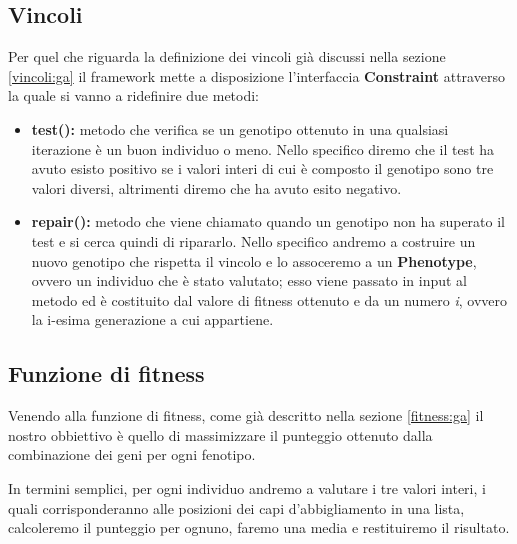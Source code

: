 \documentclass[a4paper, 11pt, oneside]{report}
\begin{document}
                \subsection{Vincoli}
                \par \noindent Per quel che riguarda la definizione dei vincoli già discussi nella sezione \ref{vincoli:ga}
                il framework mette a disposizione l'interfaccia \textbf{Constraint} attraverso la quale si vanno a ridefinire
                due metodi:
                \begin{itemize}
                    \item \textbf{test():} metodo che verifica se un genotipo ottenuto in una qualsiasi iterazione è un
                    buon individuo o meno.
                    Nello specifico diremo che il test ha avuto esisto positivo se i valori interi di cui è composto il
                    genotipo sono tre valori diversi, altrimenti diremo che ha avuto esito negativo.
                    \item \textbf{repair():} metodo che viene chiamato quando un genotipo non ha superato il test e si
                    cerca quindi di ripararlo.
                    Nello specifico andremo a costruire un nuovo genotipo che rispetta il vincolo e lo assoceremo a un
                    \textbf{Phenotype}, ovvero un individuo che è stato valutato; esso viene passato in input al metodo
                    ed è costituito dal valore di fitness ottenuto e da un numero \emph{i}, ovvero la i-esima generazione
                    a cui appartiene.
                \end{itemize}

                \subsection{Funzione di fitness}
                \par \noindent Venendo alla funzione di fitness, come già descritto nella sezione \ref{fitness:ga} il
                nostro obbiettivo è quello di massimizzare il punteggio ottenuto dalla combinazione dei geni per ogni
                fenotipo.
                \par \noindent In termini semplici, per ogni individuo andremo a valutare i tre valori interi, i quali
                corrisponderanno alle posizioni dei capi d'abbigliamento in una lista, calcoleremo il punteggio per ognuno,
                faremo una media e restituiremo il risultato.
\end{document}
